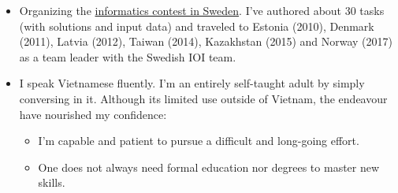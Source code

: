 \documentclass[11pt]{res} %
\begin{document}
\begin{resume}
\begin{itemize} %
  \item Organizing the \href{http://progolymp.se/}{informatics contest in Sweden}.
    I've authored about
    30 tasks (with solutions and input data) and traveled to Estonia (2010),
    Denmark (2011), Latvia (2012), Taiwan (2014), Kazakhstan (2015) and Norway (2017) as a
    team leader with the Swedish IOI team.
  \item I speak Vietnamese fluently. I'm an entirely self-taught adult by simply
    conversing in it.  Although its limited use outside of
    Vietnam,  the endeavour have nourished my confidence:
    \begin{itemize}
        \item I'm capable and patient to pursue a difficult and long-going effort.
        \item One does not always need formal education nor degrees to master new skills.
    \end{itemize}
\end{itemize}

\end{resume}
\end{document}

